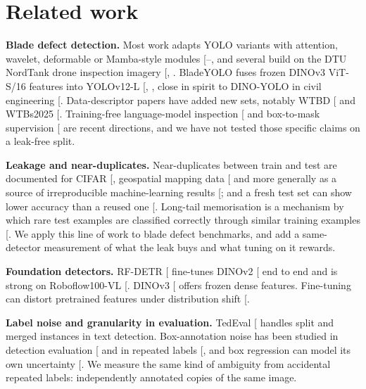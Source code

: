 \documentclass[
  10pt,
]{article}
\begin{document}
\section{Related work}\label{related-work}

\textbf{Blade defect detection.} Most work adapts YOLO variants with
attention, wavelet, deformable or Mamba-style modules
{[}--\citeproc{ref-kgpyolo}{4}{]}, and
several build on the DTU NordTank drone inspection imagery
{[}, \citeproc{ref-foster}{6}{]}. BladeYOLO
fuses frozen DINOv3 ViT-S/16 features into YOLOv12-L
{[}, \citeproc{ref-yolov12}{7}{]}, close in
spirit to DINO-YOLO in civil engineering
{[}\citeproc{ref-dinoyolo}{8}{]}. Data-descriptor papers have added new
sets, notably WTBD {[}\citeproc{ref-wtbd}{9}{]} and WTBs2025
{[}\citeproc{ref-wtbs2025}{10}{]}. Training-free language-model
inspection {[}\citeproc{ref-seeingunseen}{11}{]} and box-to-mask
supervision {[}\citeproc{ref-boxes2pixels}{12}{]} are recent directions,
and we have not tested those specific claims on a leak-free split.

\textbf{Leakage and near-duplicates.} Near-duplicates between train and
test are documented for CIFAR {[}\citeproc{ref-barz}{13}{]}, geospatial
mapping data {[}\citeproc{ref-adimoolam}{14}{]} and more generally as a
source of irreproducible machine-learning results
{[}\citeproc{ref-kapoor}{15}{]}; and a fresh test set can show lower
accuracy than a reused one {[}\citeproc{ref-recht}{16}{]}. Long-tail
memorisation is a mechanism by which rare test examples are classified
correctly through similar training examples
{[}\citeproc{ref-feldman}{17}{]}. We apply this line of work to blade
defect benchmarks, and add a same-detector measurement of what the leak
buys and what tuning on it rewards.

\textbf{Foundation detectors.} RF-DETR {[}\citeproc{ref-rfdetr}{18}{]}
fine-tunes DINOv2 {[}\citeproc{ref-dinov2}{19}{]} end to end and is
strong on Roboflow100-VL {[}\citeproc{ref-rf100vl}{20}{]}. DINOv3
{[}\citeproc{ref-dinov3}{21}{]} offers frozen dense features.
Fine-tuning can distort pretrained features under distribution shift
{[}\citeproc{ref-lpft}{22}{]}.

\textbf{Label noise and granularity in evaluation.} TedEval
{[}\citeproc{ref-tedeval}{23}{]} handles split and merged instances in
text detection. Box-annotation noise has been studied in detection
evaluation {[}\citeproc{ref-murrugarra}{24}{]} and in repeated labels
{[}\citeproc{ref-tschirschwitz}{25}{]}, and box regression can model its
own uncertainty {[}\citeproc{ref-klloss}{26}{]}. We measure the same
kind of ambiguity from accidental repeated labels: independently
annotated copies of the same image.
\end{document}
